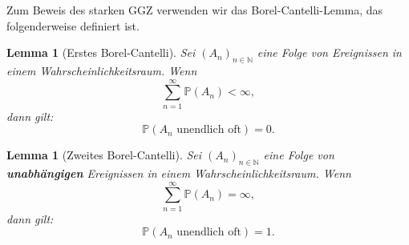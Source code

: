 \documentclass[aodsor,preprint]{imsart}
\numberwithin{equation}{section}
\theoremstyle{plain}
\newtheorem{lemma}[thm]{Lemma}
\begin{document}
Zum Beweis des starken GGZ verwenden wir das Borel-Cantelli-Lemma, das folgenderweise definiert ist.

\begin{lemma}[Erstes Borel-Cantelli]
Sei \( (A_n)_{n \in \mathbb{N}} \) eine Folge von Ereignissen in einem Wahrscheinlichkeitsraum. Wenn
\[
\sum_{n=1}^\infty \mathbb{P}(A_n) < \infty,
\]
dann gilt:
\[
\mathbb{P}(A_n \text{ unendlich oft}) = 0.
\]
\end{lemma}

\begin{lemma}[Zweites Borel-Cantelli]
Sei \( (A_n)_{n \in \mathbb{N}} \) eine Folge von \textbf{unabhängigen} Ereignissen in einem Wahrscheinlichkeitsraum. Wenn
\[
\sum_{n=1}^\infty \mathbb{P}(A_n) = \infty,
\]
dann gilt:
\[
\mathbb{P}(A_n \text{ unendlich oft}) = 1.
\]
\end{lemma}
\end{document}
